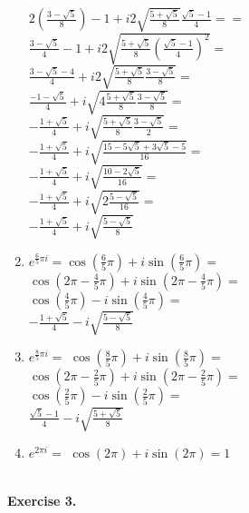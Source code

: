 \documentclass{article}
\begin{document}
\begin{enumerate}
        \( 2 (\frac{3 - \sqrt{5}}{8}) - 1 + i 2 \sqrt{ \frac{5 + \sqrt{5}}{8}} { \frac{\sqrt{5} - 1}{4}} = = \) \\ %
        \( \frac{3 - \sqrt{5}}{4} - 1 + i 2 \sqrt{ \frac{5 + \sqrt{5}}{8}  \left(\frac{\sqrt{5} - 1}{4}\right)^2} = \) \\
        \( \frac{3 - \sqrt{5} - 4}{4} + i 2 \sqrt{ \frac{5 + \sqrt{5}}{8} \frac{3 - \sqrt{5}}{8}} = \) \\
        \( \frac{-1 - \sqrt{5}}{4} + i \sqrt{ 4 \frac{5 + \sqrt{5}}{8} \frac{3 - \sqrt{5}}{8}} = \) \\
        \(-\frac{1 + \sqrt{5}}{4}+ i \sqrt{ \frac{5 + \sqrt{5}}{8} \frac{3 - \sqrt{5}}{2}} = \) \\
        \(-\frac{1 + \sqrt{5}}{4}+ i \sqrt{ \frac{15 -5 \sqrt{5} + 3\sqrt{5} - 5}{16}}  = \) \\
        \(-\frac{1 + \sqrt{5}}{4}+ i \sqrt{ \frac{10 -2 \sqrt{5}}{16}}  = \) \\
        \(-\frac{1 + \sqrt{5}}{4}+ i \sqrt{2 \frac{5 -\sqrt{5}}{16}}  = \) \\
        \(-\frac{1 + \sqrt{5}}{4}+ i \sqrt{\frac{5 -\sqrt{5}}{8}}  \) 
    \item \(e^{\frac{6}{5} \pi i } =
        \cos \left( \frac{6}{5} \pi \right) + i \sin \left( \frac{6}{5} \pi \right) = \) \\
        \(\cos \left( 2 \pi - \frac{4}{5} \pi \right) + i \sin \left( 2 \pi - \frac{4}{5} \pi \right) = \) \\
        \(\cos \left( \frac{4}{5} \pi \right) - i \sin \left(\frac{4}{5} \pi \right) = \) \\
        \(-\frac{1 + \sqrt{5}}{4} - i \sqrt{\frac{5 -\sqrt{5}}{8}}  \) 
    \item \(e^{\frac{8}{5} \pi i } =\) 
        \(\cos \left( \frac{8}{5} \pi \right) + i \sin \left( \frac{8}{5} \pi \right) = \) \\
        \(\cos \left( 2 \pi - \frac{2}{5} \pi \right) + i \sin \left( 2 \pi - \frac{2}{5} \pi \right) = \) \\
        \(\cos \left( \frac{2}{5} \pi \right) - i \sin \left(\frac{2}{5} \pi \right) = \) \\
        \( \frac{\sqrt{5} - 1}{4} - i \sqrt{ \frac{5 + \sqrt{5}}{8} } \)
    \item \(e^{2 \pi i } =\) 
        \(\cos \left( 2 \pi \right) + i \sin \left( 2 \pi \right) = 1\) \\
\end{enumerate}
\pagebreak
\\
\textbf{Exercise 3.}\\
\end{document}
